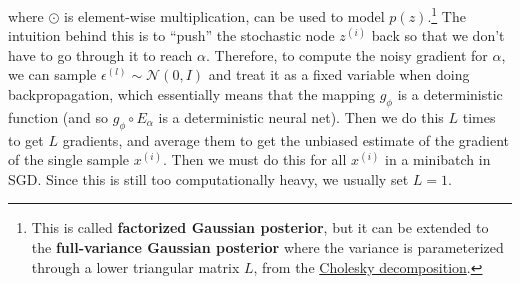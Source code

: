   where $\odot$ is element-wise multiplication, can be used to model $p(z)$.\footnote{This is called \textbf{factorized Gaussian posterior}, but it can be extended to the \textbf{full-variance Gaussian posterior} where the variance is parameterized through a lower triangular matrix $L$, from the \hyperref[lin-def:cholesky-decomposition]{Cholesky decomposition}.} The intuition behind this is to ``push'' the stochastic node $z^{(i)}$ back so that we don't have to go through it to reach $\alpha$. Therefore, to compute the noisy gradient for $\alpha$, we can sample $\epsilon^{(l)} \sim \mathcal{N}(0, I)$ and treat it as a fixed variable when doing backpropagation, which essentially means that the mapping $g_\phi$ is a deterministic function (and so $g_\phi \circ E_\alpha$ is a deterministic neural net). Then we do this $L$ times to get $L$ gradients, and average them to get the unbiased estimate of the gradient of the single sample $x^{(i)}$. Then we must do this for all $x^{(i)}$ in a minibatch in SGD. Since this is still too computationally heavy, we usually set $L=1$. 

